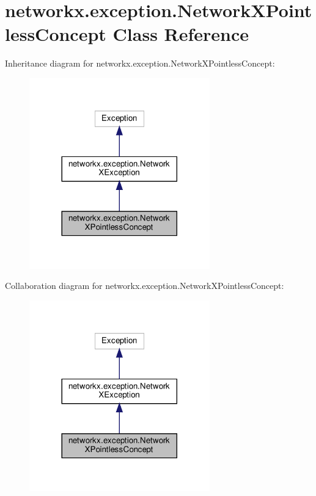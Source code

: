 \hypertarget{classnetworkx_1_1exception_1_1NetworkXPointlessConcept}{}\section{networkx.\+exception.\+Network\+X\+Pointless\+Concept Class Reference}
\label{classnetworkx_1_1exception_1_1NetworkXPointlessConcept}


Inheritance diagram for networkx.\+exception.\+Network\+X\+Pointless\+Concept\+:
\nopagebreak
\begin{figure}[H]
\begin{center}
\leavevmode
\includegraphics[width=221pt]{classnetworkx_1_1exception_1_1NetworkXPointlessConcept__inherit__graph}
\end{center}
\end{figure}


Collaboration diagram for networkx.\+exception.\+Network\+X\+Pointless\+Concept\+:
\nopagebreak
\begin{figure}[H]
\begin{center}
\leavevmode
\includegraphics[width=221pt]{classnetworkx_1_1exception_1_1NetworkXPointlessConcept__coll__graph}
\end{center}
\end{figure}


